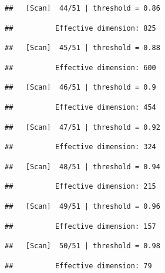 \documentclass[
]{book}
\begin{document}
\begin{verbatim}
##   [Scan]  44/51 | threshold = 0.86
\end{verbatim}

\begin{verbatim}
##          Effective dimension: 825
\end{verbatim}

\begin{verbatim}
##   [Scan]  45/51 | threshold = 0.88
\end{verbatim}

\begin{verbatim}
##          Effective dimension: 600
\end{verbatim}

\begin{verbatim}
##   [Scan]  46/51 | threshold = 0.9
\end{verbatim}

\begin{verbatim}
##          Effective dimension: 454
\end{verbatim}

\begin{verbatim}
##   [Scan]  47/51 | threshold = 0.92
\end{verbatim}

\begin{verbatim}
##          Effective dimension: 324
\end{verbatim}

\begin{verbatim}
##   [Scan]  48/51 | threshold = 0.94
\end{verbatim}

\begin{verbatim}
##          Effective dimension: 215
\end{verbatim}

\begin{verbatim}
##   [Scan]  49/51 | threshold = 0.96
\end{verbatim}

\begin{verbatim}
##          Effective dimension: 157
\end{verbatim}

\begin{verbatim}
##   [Scan]  50/51 | threshold = 0.98
\end{verbatim}

\begin{verbatim}
##          Effective dimension: 79
\end{verbatim}
\end{document}
